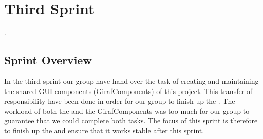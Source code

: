 \part{Third Sprint}
\label{par:third_sprint}

.

\chapter{Sprint Overview}
In the third sprint our group have hand over the task of creating and maintaining the shared GUI components (GirafComponents) of this project. This transfer of responsibility have been done in order for our group to finish up the \ct. The workload of both the \ct and the GirafComponents was too much for our group to guarantee that we could complete both tasks. The focus of this sprint is therefore to finish up the \ct and ensure that it works stable after this sprint.

